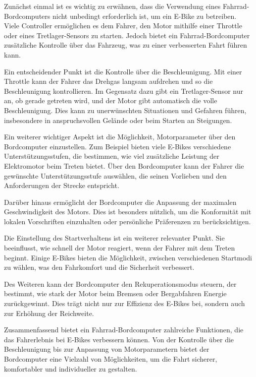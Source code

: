 Zunächst einmal ist es wichtig zu erwähnen, dass die Verwendung eines Fahrrad-Bordcomputers nicht unbedingt erforderlich ist, um ein E-Bike zu betreiben. Viele Controller ermöglichen es dem Fahrer, den Motor mithilfe einer Throttle oder eines Tretlager-Sensors zu starten. Jedoch bietet ein Fahrrad-Bordcomputer zusätzliche Kontrolle über das Fahrzeug, was zu einer verbesserten Fahrt führen kann.

Ein entscheidender Punkt ist die Kontrolle über die Beschleunigung. Mit einer Throttle kann der Fahrer das Drehgas langsam aufdrehen und so die Beschleunigung kontrollieren. Im Gegensatz dazu gibt ein Tretlager-Sensor nur an, ob gerade getreten wird, und der Motor gibt automatisch die volle Beschleunigung. Dies kann zu unerwünschten Situationen und Gefahren führen, insbesondere in anspruchsvollen Gelände oder beim Starten an Steigungen.

Ein weiterer wichtiger Aspekt ist die Möglichkeit, Motorparameter über den Bordcomputer einzustellen. Zum Beispiel bieten viele E-Bikes verschiedene Unterstützungsstufen, die bestimmen, wie viel zusätzliche Leistung der Elektromotor beim Treten bietet. Über den Bordcomputer kann der Fahrer die gewünschte Unterstützungsstufe auswählen, die seinen Vorlieben und den Anforderungen der Strecke entspricht.

Darüber hinaus ermöglicht der Bordcomputer die Anpassung der maximalen Geschwindigkeit des Motors. Dies ist besonders nützlich, um die Konformität mit lokalen Vorschriften einzuhalten oder persönliche Präferenzen zu berücksichtigen.

Die Einstellung des Startverhaltens ist ein weiterer relevanter Punkt. Sie beeinflusst, wie schnell der Motor reagiert, wenn der Fahrer mit dem Treten beginnt. Einige E-Bikes bieten die Möglichkeit, zwischen verschiedenen Startmodi zu wählen, was den Fahrkomfort und die Sicherheit verbessert.

Des Weiteren kann der Bordcomputer den Rekuperationsmodus steuern, der bestimmt, wie stark der Motor beim Bremsen oder Bergabfahren Energie zurückgewinnt. Dies trägt nicht nur zur Effizienz des E-Bikes bei, sondern auch zur Erhöhung der Reichweite.

Zusammenfassend bietet ein Fahrrad-Bordcomputer zahlreiche Funktionen, die das Fahrerlebnis bei E-Bikes verbessern können. Von der Kontrolle über die Beschleunigung bis zur Anpassung von Motorparametern bietet der Bordcomputer eine Vielzahl von Möglichkeiten, um die Fahrt sicherer, komfortabler und individueller zu gestalten. 


